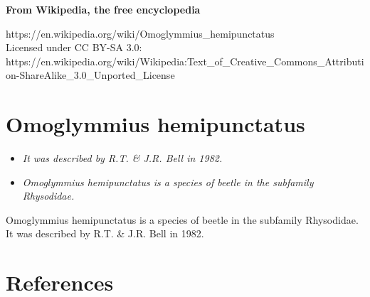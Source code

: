 \textbf{From Wikipedia, the free encyclopedia}

https://en.wikipedia.org/wiki/Omoglymmius\_hemipunctatus\\
Licensed under CC BY-SA 3.0:\\
https://en.wikipedia.org/wiki/Wikipedia:Text\_of\_Creative\_Commons\_Attribution-ShareAlike\_3.0\_Unported\_License

\section{Omoglymmius hemipunctatus}\label{omoglymmius-hemipunctatus}

\begin{itemize}
\item
  \emph{It was described by R.T. \& J.R. Bell in 1982.}
\item
  \emph{Omoglymmius hemipunctatus is a species of beetle in the
  subfamily Rhysodidae.}
\end{itemize}

Omoglymmius hemipunctatus is a species of beetle in the subfamily
Rhysodidae. It was described by R.T. \& J.R. Bell in 1982.

\section{References}\label{references}
